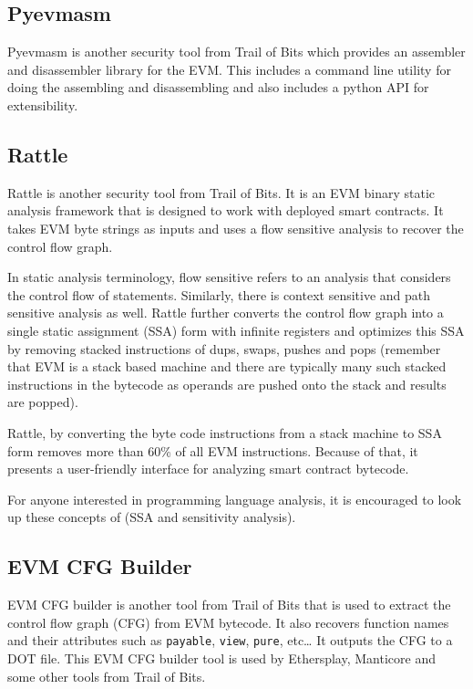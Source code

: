 \subsection{Pyevmasm}\label{pyevmasm}

Pyevmasm is another security tool from Trail of Bits which provides an
assembler and disassembler library for the EVM. This includes a command
line utility for doing the assembling and disassembling and also
includes a python API for extensibility.

\subsection{Rattle}\label{rattle}

Rattle is another security tool from Trail of Bits. It is an EVM binary
static analysis framework that is designed to work with deployed smart
contracts. It takes EVM byte strings as inputs and uses a flow sensitive
analysis to recover the control flow graph.

In static analysis terminology, flow sensitive refers to an analysis
that considers the control flow of statements. Similarly, there is
context sensitive and path sensitive analysis as well. Rattle further
converts the control flow graph into a single static assignment (SSA)
form with infinite registers and optimizes this SSA by removing stacked
instructions of dups, swaps, pushes and pops (remember that EVM is a
stack based machine and there are typically many such stacked
instructions in the bytecode as operands are pushed onto the stack and
results are popped).

Rattle, by converting the byte code instructions from a stack machine to
SSA form removes more than 60\% of all EVM instructions. Because of
that, it presents a user-friendly interface for analyzing smart contract
bytecode.

For anyone interested in programming language analysis, it is encouraged
to look up these concepts of (SSA and sensitivity analysis).

\subsection{EVM CFG Builder}\label{evm-cfg-builder}

EVM CFG builder is another tool from Trail of Bits that is used to
extract the control flow graph (CFG) from EVM bytecode. It also recovers
function names and their attributes such as \texttt{payable},
\texttt{view}, \texttt{pure}, etc\ldots{} It outputs the CFG to a DOT
file. This EVM CFG builder tool is used by Ethersplay, Manticore and
some other tools from Trail of Bits.

